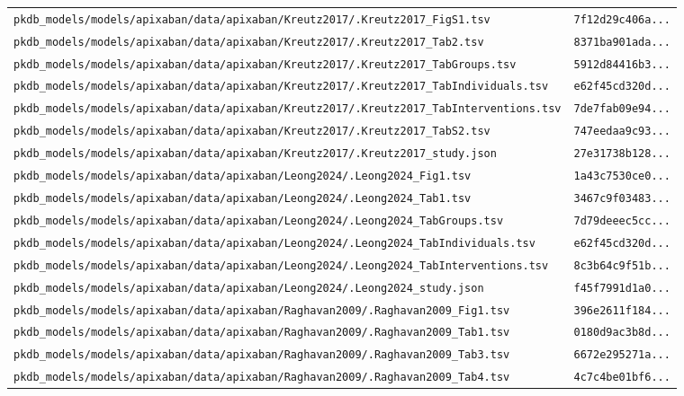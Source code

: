 \documentclass{article}
\begin{document}
\begin{longtable}{ll}
\texttt{pkdb\_models/models/apixaban/data/apixaban/Kreutz2017/.Kreutz2017\_FigS1.tsv} & \texttt{7f12d29c406a...} \\
\texttt{pkdb\_models/models/apixaban/data/apixaban/Kreutz2017/.Kreutz2017\_Tab2.tsv} & \texttt{8371ba901ada...} \\
\texttt{pkdb\_models/models/apixaban/data/apixaban/Kreutz2017/.Kreutz2017\_TabGroups.tsv} & \texttt{5912d84416b3...} \\
\texttt{pkdb\_models/models/apixaban/data/apixaban/Kreutz2017/.Kreutz2017\_TabIndividuals.tsv} & \texttt{e62f45cd320d...} \\
\texttt{pkdb\_models/models/apixaban/data/apixaban/Kreutz2017/.Kreutz2017\_TabInterventions.tsv} & \texttt{7de7fab09e94...} \\
\texttt{pkdb\_models/models/apixaban/data/apixaban/Kreutz2017/.Kreutz2017\_TabS2.tsv} & \texttt{747eedaa9c93...} \\
\texttt{pkdb\_models/models/apixaban/data/apixaban/Kreutz2017/.Kreutz2017\_study.json} & \texttt{27e31738b128...} \\
\texttt{pkdb\_models/models/apixaban/data/apixaban/Leong2024/.Leong2024\_Fig1.tsv} & \texttt{1a43c7530ce0...} \\
\texttt{pkdb\_models/models/apixaban/data/apixaban/Leong2024/.Leong2024\_Tab1.tsv} & \texttt{3467c9f03483...} \\
\texttt{pkdb\_models/models/apixaban/data/apixaban/Leong2024/.Leong2024\_TabGroups.tsv} & \texttt{7d79deeec5cc...} \\
\texttt{pkdb\_models/models/apixaban/data/apixaban/Leong2024/.Leong2024\_TabIndividuals.tsv} & \texttt{e62f45cd320d...} \\
\texttt{pkdb\_models/models/apixaban/data/apixaban/Leong2024/.Leong2024\_TabInterventions.tsv} & \texttt{8c3b64c9f51b...} \\
\texttt{pkdb\_models/models/apixaban/data/apixaban/Leong2024/.Leong2024\_study.json} & \texttt{f45f7991d1a0...} \\
\texttt{pkdb\_models/models/apixaban/data/apixaban/Raghavan2009/.Raghavan2009\_Fig1.tsv} & \texttt{396e2611f184...} \\
\texttt{pkdb\_models/models/apixaban/data/apixaban/Raghavan2009/.Raghavan2009\_Tab1.tsv} & \texttt{0180d9ac3b8d...} \\
\texttt{pkdb\_models/models/apixaban/data/apixaban/Raghavan2009/.Raghavan2009\_Tab3.tsv} & \texttt{6672e295271a...} \\
\texttt{pkdb\_models/models/apixaban/data/apixaban/Raghavan2009/.Raghavan2009\_Tab4.tsv} & \texttt{4c7c4be01bf6...} \\

\end{longtable}
\end{document}
